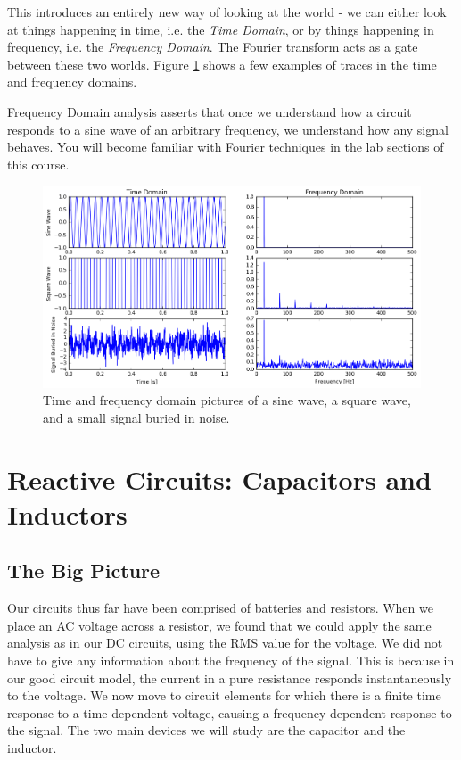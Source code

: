 \documentclass{tufte-book}
\begin{document}
\noindent This introduces an entirely new way of looking at the world - we can either look at things happening in time, i.e. the \textit{Time Domain}, or by things happening in frequency, i.e. the \textit{Frequency Domain}. The Fourier transform acts as a gate between these two worlds. Figure \ref{fig:FourierExamples} shows a few examples of traces in the time and frequency domains.

Frequency Domain analysis asserts that once we understand how a circuit responds to a sine wave of an arbitrary frequency, we understand how any signal behaves. You will become familiar with Fourier techniques in the lab sections of this course.

\begin{figure}[h]
\caption{Time and frequency domain pictures of a sine wave, a square wave, and a small signal buried in noise.}
\label{fig:FourierExamples}
\begin{center}
\includegraphics[width=\textwidth]{FourierExamples}
\end{center}
\end{figure}


\chapter{Reactive Circuits: Capacitors and Inductors}

\section{The Big Picture}

Our circuits thus far have been comprised of batteries and resistors. When we place an AC voltage across a resistor, we found that we could apply the same analysis as in our DC circuits, using the RMS value for the voltage. We did not have to give any information about the frequency of the signal. This is because in our good circuit model, the current in a pure resistance responds instantaneously to the voltage. We now move to circuit elements for which there is a finite time response to a time dependent voltage, causing a frequency dependent response to the signal. The two main devices we will study are the capacitor and the inductor. 
\end{document}
